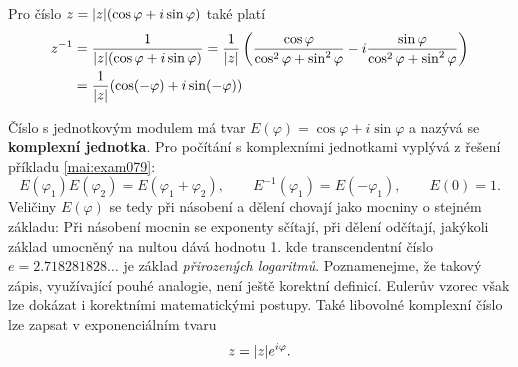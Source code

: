     Pro číslo \(z = \lvert z\rvert(\cos\varphi+ i\sin\varphi)\) také platí
    \begin{align*}
      z^{-1} &= \dfrac{1}{\lvert z\rvert(\cos\varphi+ i\sin\varphi)} 
              = \dfrac{1}{\lvert z\rvert}
                \left(\dfrac{\cos\varphi}{\cos^2\varphi + \sin^2\varphi}
                    -i\dfrac{\sin\varphi}{\cos^2\varphi + \sin^2\varphi}\right) \\
             &= \dfrac{1}{\lvert z\rvert}(\cos(-\varphi)+ i\sin(-\varphi))
    \end{align*}
    
    Číslo s jednotkovým modulem má tvar \(E(\varphi) = \cos\varphi+i\sin\varphi\) a nazývá se 
    \textbf{komplexní jednotka}. Pro počítání s komplexními jednotkami vyplývá z řešení příkladu 
    \ref{mai:exam079}:
    \begin{equation}\label{mai:eq75}
      E(\varphi_1)E(\varphi_2) = E(\varphi_1 + \varphi_2), \qquad  
      E^{-1}(\varphi_1) = E(-\varphi_1), \qquad E(0) = 1.
    \end{equation}
    Veličiny \(E(\varphi)\) se tedy při násobení a dělení chovají jako mocniny o stejném základu: 
    Při násobení mocnin se exponenty sčítají, při dělení odčítají, jakýkoli základ umocněný na 
    nultou dává hodnotu \num{1}. 
    kde transcendentní číslo \(e = \num{2.718 281828}\ldots\) je základ \emph{přirozených 
    logaritmů}. Poznamenejme, že takový zápis, využívající pouhé analogie, není ještě korektní 
    definicí. Eulerův vzorec však lze dokázat i korektními matematickými postupy. Také libovolné 
    komplexní číslo lze zapsat v exponenciálním tvaru 
    \begin{equation}\label{mai:eq77}
      z = \lvert z\rvert e^{i\varphi}.
    \end{equation}
      
    

    
